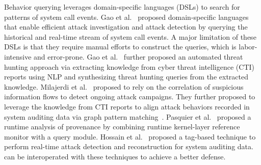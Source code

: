 Behavior querying leverages domain-specific languages (DSLs) to search for patterns of system call events.
Gao et al.~\cite{gao2018aiql,gao2018saql} proposed domain-specific languages that enable efficient attack investigation and attack detection by querying the historical and real-time stream of system call events.
A major limitation of these DSLs is that they require manual efforts to construct the queries, which is labor-intensive and error-prone.
Gao et al.~\cite{gao2021enabling} further proposed an automated threat hunting approach via extracting knowledge from cyber threat intelligence (CTI) reports using NLP and synthesizing threat hunting queries from the extracted knowledge.
Milajerdi et al.~\cite{HOLMES} proposed to rely on the correlation of suspicious information flows to detect ongoing attack campaigns.
They further proposed to leverage the knowledge from CTI reports to align attack behaviors recorded in system auditing data via graph pattern matching~\cite{poirot}. 
Pasquier et al.~\cite{pasquier2018runtime} proposed a runtime analysis of provenance by combining runtime kernel-layer reference monitor with a query module. 
Hossain et al.~\cite{sleuth} proposed a tag-based technique to perform real-time attack detection and reconstruction for system auditing data. 
\tool can be interoperated with these techniques to achieve a better defense.











